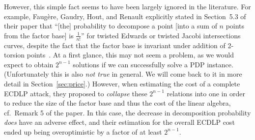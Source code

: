 However, this simple fact seems to have been largely ignored in the
literature.
%
For example, Faug\`ere, Gaudry, Hout, and Renault explicitly stated in
Section~5.3 of their paper that ``[the] probability to decompose a
point [into a sum of $n$ points from the factor base] is
$\frac{1}{n!}$'' for twisted Edwards or twisted Jacobi intersections
curves, despite the fact that the factor base is invariant under
addition of 2-torsion points~\cite{DBLP:journals/joc/FaugereGHR14}.
%
At a first glance, this may not seem a problem, as we would expect to
obtain $2^{n-1}$ solutions if we can successfully solve a PDP
instance.
%
(Unfortunately this is also \emph{not true} in general.  We will come
back to it in more detail in Section~\ref{sec:price}.)
% 
However, when estimating the cost of a complete ECDLP attack, they
proposed to \emph{collapse} these $2^{n-1}$ relations into one in
order to reduce the size of the factor base and thus the cost of the
linear algebra, cf.~Remark 5 of the paper.
%
In this case, the decrease in decomposition probability \emph{does}
have an adverse effect, and their estimation for the overall ECDLP
cost ended up being overoptimistic by a factor of at least $2^{n-1}$.

